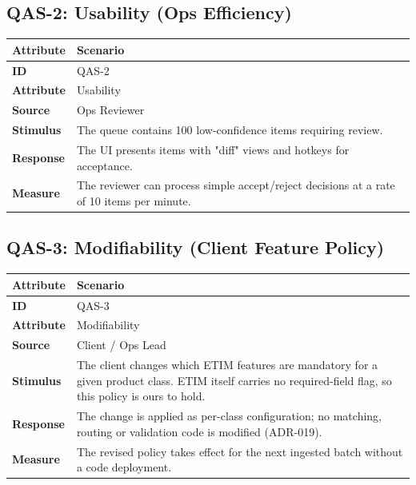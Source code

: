 \documentclass[12pt, a4paper]{article}
\begin{document}
\subsection*{QAS-2: Usability (Ops Efficiency)}
\begin{longtable}{@{}lp{12cm}@{}}
\toprule
\textbf{Attribute} & \textbf{Scenario} \\
\midrule
\textbf{ID} & QAS-2 \\
\textbf{Attribute} & Usability \\
\textbf{Source} & Ops Reviewer \\
\textbf{Stimulus} & The queue contains 100 low-confidence items requiring review. \\
\textbf{Response} & The UI presents items with "diff" views and hotkeys for acceptance. \\
\textbf{Measure} & The reviewer can process simple accept/reject decisions at a rate of 10 items per minute. \\
\bottomrule
\end{longtable}

\subsection*{QAS-3: Modifiability (Client Feature Policy)}
\begin{longtable}{@{}lp{12cm}@{}}
\toprule
\textbf{Attribute} & \textbf{Scenario} \\
\midrule
\textbf{ID} & QAS-3 \\
\textbf{Attribute} & Modifiability \\
\textbf{Source} & Client / Ops Lead \\
\textbf{Stimulus} & The client changes which ETIM features are mandatory for a given product class. ETIM itself carries no required-field flag, so this policy is ours to hold. \\
\textbf{Response} & The change is applied as per-class configuration; no matching, routing or validation code is modified (ADR-019). \\
\textbf{Measure} & The revised policy takes effect for the next ingested batch without a code deployment. \\
\bottomrule
\end{longtable}
\end{document}
